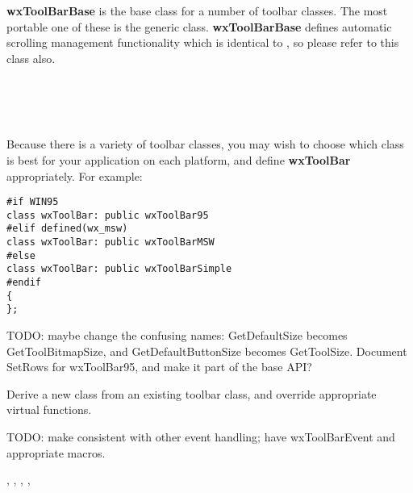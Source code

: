 \section{}\label{wxtoolbarbase}

{\bf wxToolBarBase} is the base class for a number of toolbar classes.  The most portable
one of these is the generic  class. {\bf wxToolBarBase} defines
automatic scrolling management functionality which is identical to ,
so please refer to this class also.


\\
\\
\\


Because there is a variety of toolbar classes, you may wish to choose which class
is best for your application on each platform, and define {\bf wxToolBar} appropriately. For example:

\begin{verbatim}
#if WIN95
class wxToolBar: public wxToolBar95
#elif defined(wx_msw)
class wxToolBar: public wxToolBarMSW
#else
class wxToolBar: public wxToolBarSimple
#endif
{
};
\end{verbatim}

TODO: maybe change the confusing names: GetDefaultSize becomes GetToolBitmapSize, and
GetDefaultButtonSize becomes GetToolSize. Document SetRows for wxToolBar95, and make it
part of the base API?


Derive a new class from an existing toolbar class, and override appropriate virtual functions.

TODO: make consistent with other event handling; have wxToolBarEvent and appropriate macros.


,\rtfsp
{},\rtfsp
{},\rtfsp
{},\rtfsp
{}


